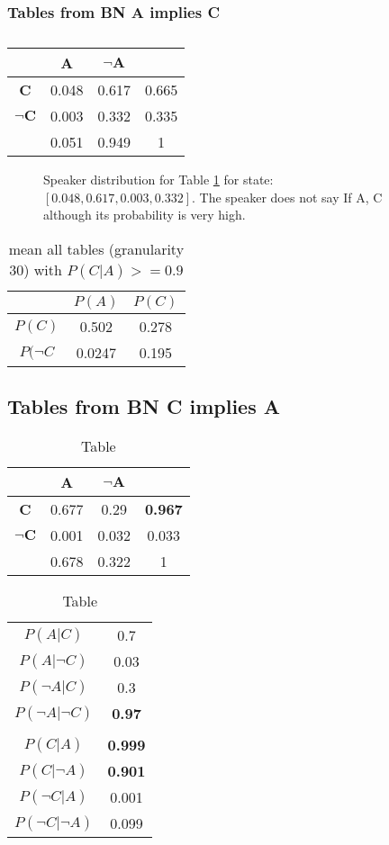 \documentclass[10pt,a4paper]{article}
\author{Britta Grusdt}
\begin{document}
\subsubsection*{Tables from BN A implies C}
\begin{table}[h]
\centering
\begin{tabular}{c|cc|c}
		   			& \textbf{A} & $\boldsymbol{\neg A}$ & \\\hline
\textbf{C} 			& 0.048 & 0.617 & 0.665 \\
$\boldsymbol{\neg C}$	& 0.003 & 0.332 & 0.335 \\ \hline
					& 0.051 & 0.949 & 1
\end{tabular}
\caption{}
\label{table:speakerBad-ac}
\end{table}

\begin{figure}[h]
\centering
\subfloat[]{\label{fig:speakerBad-ac}} 
\caption{Speaker distribution for Table \ref{table:speakerBad-ac} for state: $[0.048, 0.617, 0.003, 0.332]$. The speaker does not say If A, C although its probability is very high.}
\end{figure}

\begin{table}[h]
\centering
\begin{tabular}{c|c|c} 
           & $P(A)$ & $P(C)$ \\ \hline 
$P(C)$     &  0.502 & 0.278 \\ 
$P(\neg C$ &  0.0247 & 0.195
\end{tabular}
\caption{mean all tables (granularity 30) with $P(C|A)>=0.9$}
\end{table}


\FloatBarrier
\newpage
\subsection*{Tables from BN C implies A}
\begin{table}[h]
\begin{tabular}{c|cc|c}
		   			& \textbf{A} & $\boldsymbol{\neg A}$ & \\\hline
\textbf{C} 			& 0.677 & 0.29 & \textbf{0.967} \\
$\boldsymbol{\neg C}$	& 0.001 & 0.032 & 0.033 \\ \hline
					& 0.678 & 0.322 & 1
\end{tabular}
\qquad
\begin{tabular}{c|c}
$P(A|C)$ & 0.7 \\
$P(A|\neg C)$ & 0.03\\
$P(\neg A|C)$ & 0.3\\
$P(\neg A|\neg C)$ & \textbf{0.97}\\
& \\\hline
$P(C|A)$ & \textbf{0.999}\\
$P(C|\neg A)$ & \textbf{0.901}\\
$P(\neg C|A)$ & 0.001\\
$P(\neg C|\neg A)$ & 0.099
\end{tabular}
\caption{Table}
\label{table:speakerBad-ca}
\end{table}
\vspace{1cm}
\end{document}
